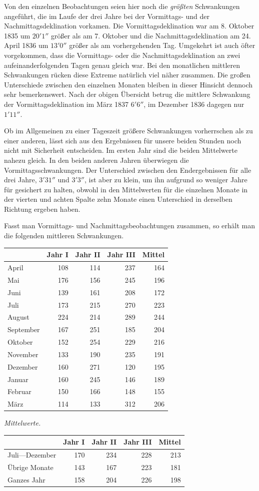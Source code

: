 Von den einzelnen Beobachtungen seien hier noch die \textit{größten} Schwankungen angeführt, die im Laufe der drei Jahre bei der Vormittags- und der Nachmittagsdeklination vorkamen. Die Vormittagsdeklination war am 8. Oktober 1835 um $20'1''$ größer als am 7. Oktober und die Nachmittagsdeklination am 24. April 1836 um $13'0''$ größer als am vorhergehenden Tag. Umgekehrt ist auch öfter vorgekommen, dass die Vormittags- oder die Nachmittagsdeklination an zwei aufeinanderfolgenden Tagen genau gleich war. Bei den monatlichen mittleren Schwankungen rücken diese Extreme natürlich viel näher zusammen. Die großen Unterschiede zwischen den einzelnen Monaten bleiben in dieser Hinsicht dennoch sehr bemerkenswert. Nach der obigen Übersicht betrug die mittlere Schwankung der Vormittagsdeklination im März 1837 $6'6''$, im Dezember 1836 dagegen nur $1'11''$.

Ob im Allgemeinen zu einer Tageszeit größere Schwankungen vorherrschen als zu einer anderen, lässt sich aus den Ergebnissen für unsere beiden Stunden noch nicht mit Sicherheit entscheiden. Im ersten Jahr sind die beiden Mittelwerte
nahezu gleich. In den beiden anderen Jahren überwiegen die Vormittagsschwankungen. Der Unterschied zwischen den Endergebnissen für alle drei Jahre, $3'31''$ und $3'3''$, ist aber zu klein, um ihn aufgrund so weniger Jahre für gesichert zu halten, obwohl in den Mittelwerten für die einzelnen Monate in der vierten und achten Spalte zehn Monate einen Unterschied in derselben Richtung ergeben haben.

Fasst man Vormittags- und Nachmittagsbeobachtungen zusammen, so erhält man die folgenden mittleren Schwankungen.
\begin{center}\small
\begin{tabular}{l|r|r|r||r}
&Jahr I&Jahr II&Jahr III&Mittel\\\hline
April&108&114&237&164\\
Mai&176&156&245&196\\
Juni&139&161&208&172\\
Juli&173&215&270&223\\
August&224&214&289&244\\
September&167&251&185&204\\
Oktober&152&254&229&216\\
November&133&190&235&191\\
Dezember&160&271&120&195\\
Januar&160&245&146&189\\
Februar&150&166&148&155\\
März&114&133&312&206
\end{tabular}
\end{center}
\begin{center}\small
\textit{Mittelwerte.}\par\smallskip
\begin{tabular}{l|r|r|r||r}
&Jahr I&Jahr II&Jahr III&Mittel\\\hline
Juli---Dezember&170&234&228&213\\
Übrige Monate&143&167&223&181\\
Ganzes Jahr&158&204&226&198
\end{tabular}
\end{center}

